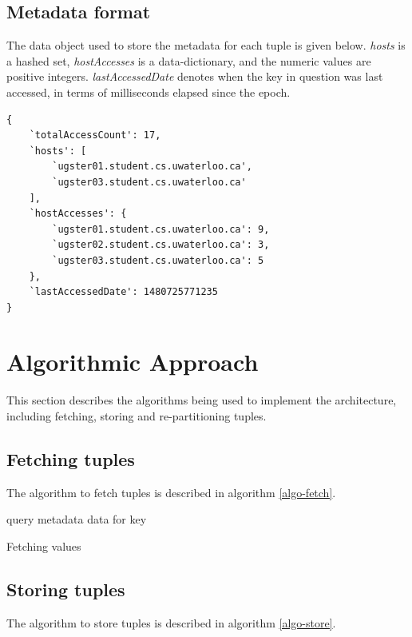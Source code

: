 \documentclass{sig-alternate}
\begin{document}
\subsection{Metadata format}
The data object used to store the metadata for each tuple is given below. \textit{hosts} is a hashed set, \textit{hostAccesses} is a data-dictionary, and the numeric values are positive integers. \textit{lastAccessedDate} denotes when the key in question was last accessed, in terms of milliseconds elapsed since the epoch.
\begin{lstlisting}
{
    `totalAccessCount': 17,
    `hosts': [
        `ugster01.student.cs.uwaterloo.ca',
        `ugster03.student.cs.uwaterloo.ca'
    ],
    `hostAccesses': {
        `ugster01.student.cs.uwaterloo.ca': 9,
        `ugster02.student.cs.uwaterloo.ca': 3,
        `ugster03.student.cs.uwaterloo.ca': 5
    },
    `lastAccessedDate': 1480725771235
}
\end{lstlisting}


\section{Algorithmic Approach}
This section describes the algorithms being used to implement the architecture, including fetching, storing and re-partitioning tuples.\\

\subsection{Fetching tuples}
The algorithm to fetch tuples is described in algorithm \ref{algo-fetch}.

\begin{algorithm}
\DontPrintSemicolon 
\;
query metadata data for key\;

\;
\label{algo-fetch}
\caption{Fetching values}
\end{algorithm}


\subsection{Storing tuples}
The algorithm to store tuples is described in algorithm \ref{algo-store}.
\end{document}
